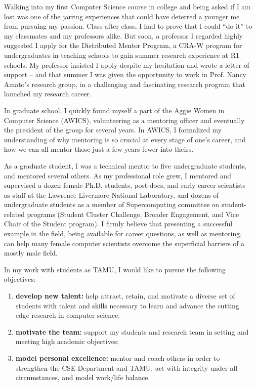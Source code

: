 \documentclass[11pt]{article}
\begin{document}
Walking into my first Computer Science course in college and being asked if I am lost
was one of the jarring experiences that could have deterred a younger me from pursuing my passion.
Class after class, I had to prove that I could ``do it'' to my classmates and my professors alike.
But soon, a professor I regarded highly suggested I apply for the Distributed Mentor Program,
a CRA-W program for undergraduates in teaching schools to gain summer research experience at R1 schools.
My professor insisted I apply despite my hesitation and wrote a letter of support --
and that summer I was given the opportunity to work in Prof. Nancy Amato's research group,
in a challenging and fascinating research program that launched my research career.

In graduate school, I quickly found myself a part of the Aggie Women in Computer Science (AWICS), volunteering as a mentoring officer
and eventually the president of the group for several years.  In AWICS, I formalized my understanding of why
mentoring is so crucial at every stage of one's career, and how we can all mentor those just a few years
fewer into theirs.

As a graduate student, I was a technical mentor to five undergraduate students, and mentored several others.
As my professional role grew, I mentored and supervised a dozen female Ph.D. students, post-docs,
and early career scientists as staff at the Lawrence Livermore National Laboratory, and dozens of undergraduate students as a member of
Supercomputing committee on student-related programs (Student Cluster Challenge, Broader Engagement,
and Vice Chair of the Student program).  I firmly believe that presenting a successful example in the field,
being available for career questions, as well as mentoring, can help many female computer scientists overcome the superficial barriers of a mostly male field.

In my work with students as TAMU, I would like to pursue the following objectives:
\begin{enumerate}
\item {\bf develop new talent:} help attract, retain, and motivate a diverse set of students with talent and skills necessary to learn and advance the cutting edge research in computer science;
\item {\bf motivate the team:} support my students and research team in setting and meeting high academic objectives;
\item {\bf model personal excellence:} mentor and coach others in order to strengthen the CSE Department and TAMU, act with integrity under all circumstances, and model work/life balance.
\end{enumerate}
\end{document}

